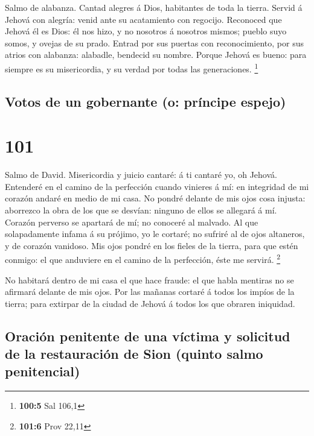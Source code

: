  Salmo de alabanza. Cantad alegres á Dios, habitantes de
toda la tierra.  Servid á Jehová con alegría: venid ante su
acatamiento con regocijo.  Reconoced que Jehová él es Dios:
él nos hizo, y no nosotros á nosotros mismos; pueblo suyo somos, y
ovejas de su prado.  Entrad por sus puertas con
reconocimiento, por sus atrios con alabanza: alabadle, bendecid su
nombre.  Porque Jehová es bueno: para siempre es su
misericordia, y su verdad por todas las generaciones. \footnote{\textbf{100:5}
  Sal 106,1}

\hypertarget{votos-de-un-gobernante-o-pruxedncipe-espejo}{%
\subsection{Votos de un gobernante (o: príncipe
espejo)}\label{votos-de-un-gobernante-o-pruxedncipe-espejo}}

\hypertarget{section-100}{%
\section{101}\label{section-100}}

 Salmo de David. Misericordia y juicio cantaré: á ti cantaré
yo, oh Jehová.  Entenderé en el camino de la perfección
cuando vinieres á mí: en integridad de mi corazón andaré en medio de mi
casa.  No pondré delante de mis ojos cosa injusta: aborrezco
la obra de los que se desvían: ninguno de ellos se allegará á mí.
 Corazón perverso se apartará de mí; no conoceré al malvado.
 Al que solapadamente infama á su prójimo, yo le cortaré; no
sufriré al de ojos altaneros, y de corazón vanidoso.  Mis
ojos pondré en los fieles de la tierra, para que estén conmigo: el que
anduviere en el camino de la perfección, éste me servirá. \footnote{\textbf{101:6}
  Prov 22,11}

 No habitará dentro de mi casa el que hace fraude: el que
habla mentiras no se afirmará delante de mis ojos.  Por las
mañanas cortaré á todos los impíos de la tierra; para extirpar de la
ciudad de Jehová á todos los que obraren iniquidad.

\hypertarget{oraciuxf3n-penitente-de-una-vuxedctima-y-solicitud-de-la-restauraciuxf3n-de-sion-quinto-salmo-penitencial}{%
\subsection{Oración penitente de una víctima y solicitud de la
restauración de Sion (quinto salmo
penitencial)}\label{oraciuxf3n-penitente-de-una-vuxedctima-y-solicitud-de-la-restauraciuxf3n-de-sion-quinto-salmo-penitencial}}

